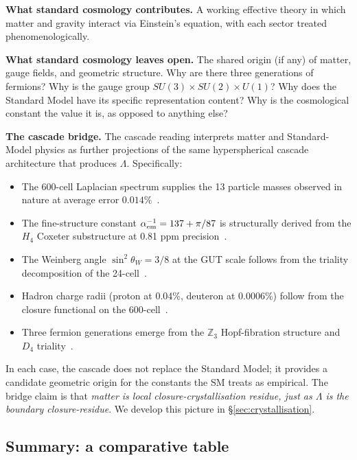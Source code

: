 \documentclass[11pt]{article}
\theoremstyle{plain}
\theoremstyle{definition}
\theoremstyle{remark}
\begin{document}
\medskip
\noindent\textbf{What standard cosmology contributes.} A working effective theory in which matter and gravity interact via Einstein's equation, with each sector treated phenomenologically.

\medskip
\noindent\textbf{What standard cosmology leaves open.} The shared origin (if any) of matter, gauge fields, and geometric structure. Why are there three generations of fermions? Why is the gauge group $SU(3) \times SU(2) \times U(1)$? Why does the Standard Model have its specific representation content? Why is the cosmological constant the value it is, as opposed to anything else?

\medskip
\noindent\textbf{The cascade bridge.} The cascade reading interprets matter and Standard-Model physics as further projections of the same hyperspherical cascade architecture that produces $\Lambda$. Specifically:
\begin{itemize}[leftmargin=2em]
\item The 600-cell Laplacian spectrum supplies the 13 particle masses observed in nature at average error $0.014\%$~\citep{SmartV}.
\item The fine-structure constant $\alpha_{\rm em}^{-1} = 137 + \pi/87$ is structurally derived from the $H_4$ Coxeter substructure at 0.81 ppm precision~\citep{SmartXXII}.
\item The Weinberg angle $\sin^2\theta_W = 3/8$ at the GUT scale follows from the triality decomposition of the 24-cell~\citep{SmartXXII}.
\item Hadron charge radii (proton at 0.04\%, deuteron at 0.0006\%) follow from the closure functional on the 600-cell~\citep{SmartXXXII}.
\item Three fermion generations emerge from the $\mathbb{Z}_3$ Hopf-fibration structure and $D_4$ triality~\citep{SmartXXXVI}.
\end{itemize}
In each case, the cascade does not replace the Standard Model; it provides a candidate geometric origin for the constants the SM treats as empirical. The bridge claim is that \emph{matter is local closure-crystallisation residue, just as $\Lambda$ is the boundary closure-residue}. We develop this picture in \S\ref{sec:crystallisation}.

\subsection{Summary: a comparative table}\label{sec:bridge-table}
\end{document}
